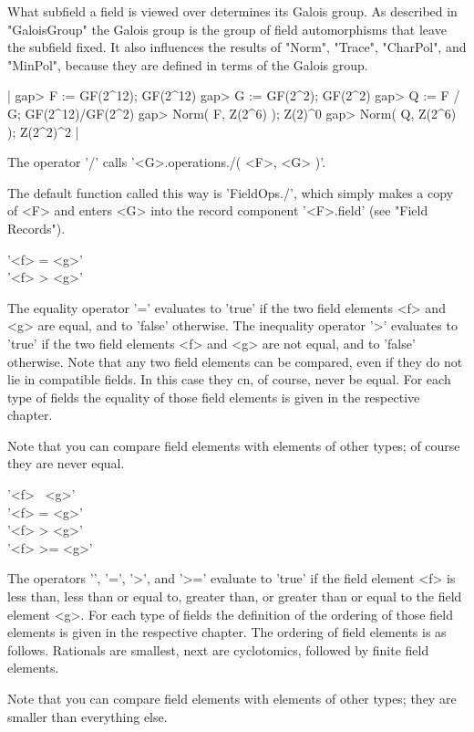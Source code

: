 What subfield a field  is viewed over  determines  its Galois  group.  As
described in    "GaloisGroup" the Galois group  is   the group   of field
automorphisms  that  leave the subfield   fixed.  It also  influences the
results of "Norm",  "Trace",  "CharPol", and  "MinPol", because they  are
defined in terms of the Galois group.

|    gap> F := GF(2^12);
    GF(2^12)
    gap> G := GF(2^2);
    GF(2^2)
    gap> Q := F / G;
    GF(2^12)/GF(2^2)
    gap> Norm( F, Z(2^6) );
    Z(2)^0
    gap> Norm( Q, Z(2^6) );
    Z(2^2)^2 |

The operator '/' calls '<G>.operations./( <F>, <G> )'.

The default function called this  way is 'FieldOps./', which simply makes
a copy  of <F> and enters <G>  into the record component '<F>.field' (see
"Field Records").


'<f> =   <g>' \\
'<f> \<> <g>'

The equality operator  '=' evaluates to 'true' if the  two field elements
<f> and <g> are equal, and to 'false' otherwise.  The inequality operator
'\<>' evaluates to 'true' if the two field  elements <f> and <g>  are not
equal, and to 'false' otherwise.  Note that any two field elements can be
compared, even  if they  do  not lie in compatible fields.   In this case
they cn, of course, never be equal.  For each type of fields the equality
of those field elements is given in the respective chapter.

Note that you can compare field elements with elements of other types; of
course they are never equal.

'<f> \<\ <g>' \\
'<f> \<= <g>' \\
'<f> >   <g>' \\
'<f> >=  <g>'

The  operators '\<', '\<=', '>', and '>=' evaluate to 'true' if the field
element <f> is less than, less than or equal to, greater than, or greater
than  or equal to the field  element  <g>.  For each  type of fields  the
definition of  the ordering of  those  field  elements is  given  in  the
respective  chapter.   The  ordering  of  field  elements is as  follows.
Rationals are smallest, next  are  cyclotomics, followed by  finite field
elements.

Note that  you can compare field elements with elements of  other  types;
they are smaller than everything else.

